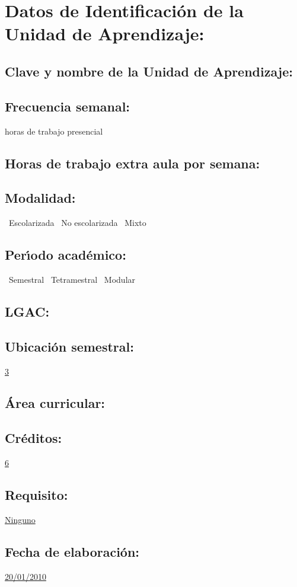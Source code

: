 \documentclass[10 pt]{article}
\begin{document}


\section{Datos de Identificaci\'{o}n de la Unidad de Aprendizaje:}
\subsection{Clave y nombre de la Unidad de Aprendizaje:} 
\subsection{Frecuencia semanal:} horas de trabajo presencial 
\subsection{Horas de trabajo extra aula por semana:} 
\subsection{Modalidad:} \yes~Escolarizada \no~No escolarizada \no~Mixto
\subsection{Per\'{\i}odo acad\'{e}mico:} \yes~Semestral
\no~Tetramestral \no~Modular
\subsection{LGAC:} \underline{\odsi}
\subsection{Ubicaci\'{o}n semestral:} \underline{3}
\subsection{\'{A}rea curricular:} \underline{\pi}
\subsection{Cr\'{e}ditos:} \underline{6}
\subsection{Requisito:} \underline{Ninguno}
\subsection{Fecha de elaboraci\'{o}n:} \underline{20/01/2010}
\end{document}
